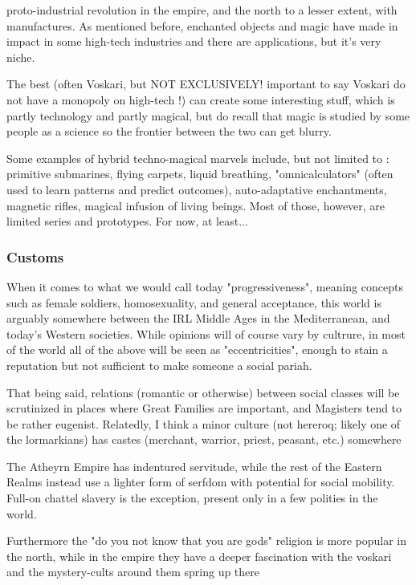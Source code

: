 proto-industrial revolution in the empire, and the north to a lesser extent, with manufactures. As mentioned before, enchanted objects and magic have made in impact in some high-tech industries and there are applications, but it's very niche.

The best (often Voskari, but NOT EXCLUSIVELY! important to say Voskari do not have a monopoly on high-tech !) can create some interesting stuff, which is partly technology and partly magical, but do recall that magic is studied by some people as a science so the frontier between the two can get blurry.


Some examples of hybrid techno-magical marvels include, but not limited to : primitive submarines, flying carpets, liquid breathing, "omnicalculators" (often used to learn patterns and predict outcomes), auto-adaptative enchantments, magnetic rifles, magical infusion of living beings. Most of those, however, are limited series and prototypes. For now, at least...




\subsubsection{Customs}

When it comes to what we would call today "progressiveness", meaning concepts such as female soldiers, homosexuality, and general acceptance, this world is arguably somewhere between the IRL Middle Ages in the Mediterranean, and today's Western societies. While opinions will of course vary by cultrure, in most of the world all of the above will be seen as "eccentricities", enough to stain a reputation but not sufficient to make someone a social pariah.

That being said, relations (romantic or otherwise) between social classes will be scrutinized in places where Great Families are important, and Magisters tend to be rather eugenist. Relatedly, I think a minor culture (not hereroq; likely one of the lormarkians) has castes (merchant, warrior, priest, peasant, etc.) somewhere

The Atheyrn Empire has indentured servitude, while the rest of the Eastern Realms instead use a lighter form of serfdom with potential for social mobility. Full-on chattel slavery is the exception, present only in a few polities in the world.

Furthermore the "do you not know that you are gods" religion is more popular in the north, while in the empire they have a deeper fascination with the voskari and the mystery-cults around them spring up there

